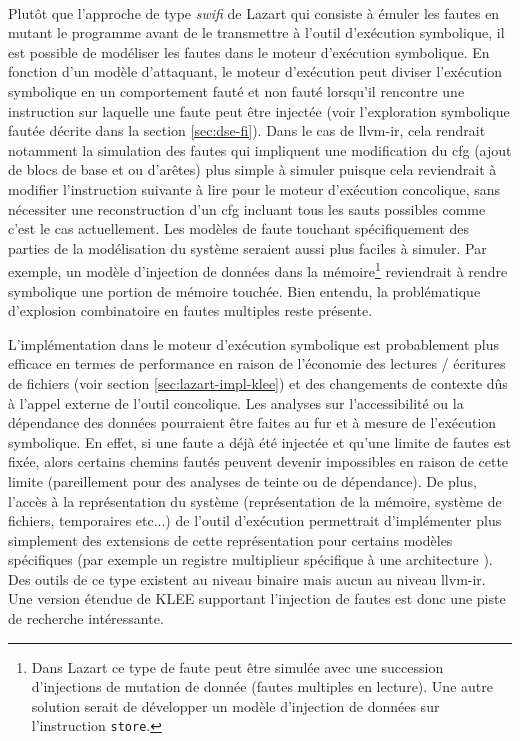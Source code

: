             \paragraph{}
            Plutôt que l'approche de type \textit{swifi} de Lazart qui consiste à émuler les fautes en mutant le programme avant de le transmettre à l'outil d'exécution symbolique, il est possible de modéliser les fautes dans le moteur d'exécution symbolique. En fonction d'un modèle d'attaquant, le moteur d'exécution peut diviser l'exécution symbolique en un comportement fauté et non fauté lorsqu'il rencontre une instruction sur laquelle une faute peut être injectée (voir l'exploration symbolique fautée décrite dans la section \ref{sec:dse-fi}). Dans le cas de \gls{llvm-ir}, cela rendrait notamment la simulation des fautes qui impliquent une modification du \gls{cfg} (ajout de blocs de base et ou d'arêtes) plus simple à simuler puisque cela reviendrait à modifier l'instruction suivante à lire pour le moteur d'exécution concolique, sans nécessiter une reconstruction d'un \gls{cfg} incluant tous les sauts possibles comme c'est le cas actuellement. 
            Les modèles de faute touchant spécifiquement des parties de la modélisation du système seraient aussi plus faciles à simuler.
            Par exemple, un modèle d'injection de données dans la mémoire\footnote{Dans Lazart ce type de faute peut être simulée avec une succession d'injections de mutation de donnée (fautes multiples en lecture). Une autre solution serait de développer un modèle d'injection de données sur l'instruction \texttt{store}.} reviendrait à rendre symbolique une portion de mémoire touchée.
            Bien entendu, la problématique d'explosion combinatoire en fautes multiples reste présente.
            
            L'implémentation dans le moteur d'exécution symbolique est probablement plus efficace en termes de performance en raison de l'économie des lectures / écritures de fichiers (voir section \ref{sec:lazart-impl-klee}) et des changements de contexte dûs à l'appel externe de l'outil concolique.
            Les analyses sur l'accessibilité ou la dépendance des données pourraient être faites au fur et à mesure de l'exécution symbolique. En effet, si une faute a déjà été injectée et qu'une limite de fautes est fixée, alors certains chemins fautés peuvent devenir impossibles en raison de cette limite (pareillement pour des analyses de teinte ou de dépendance).  
            De plus, l'accès à la représentation du système (représentation de la mémoire, système de fichiers, temporaires etc...) de l'outil d'exécution permettrait d'implémenter plus simplement des extensions de cette représentation pour certains modèles spécifiques (par exemple un registre multiplieur spécifique à une architecture \cite{Laurent/DATE19}).
            Des outils de ce type existent au niveau binaire mais aucun au niveau \gls{llvm-ir}.
            Une version étendue de KLEE supportant l'injection de fautes est donc une piste de recherche intéressante.
            
